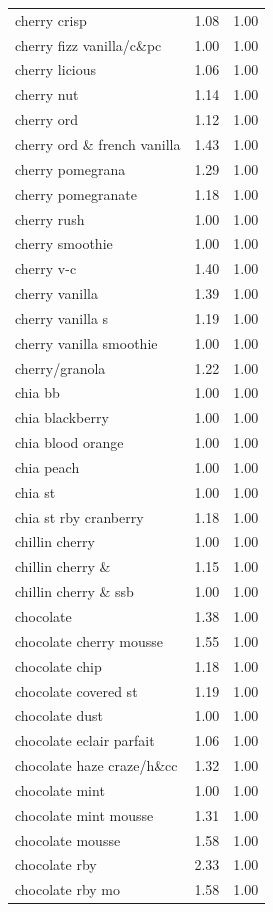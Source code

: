 \begin{table}
\begin{tabular}{lrr}
cherry crisp & 1.08 & 1.00 \\
cherry fizz vanilla/c\&pc & 1.00 & 1.00 \\
cherry licious & 1.06 & 1.00 \\
cherry nut & 1.14 & 1.00 \\
cherry ord & 1.12 & 1.00 \\
cherry ord \& french vanilla & 1.43 & 1.00 \\
cherry pomegrana & 1.29 & 1.00 \\
cherry pomegranate & 1.18 & 1.00 \\
cherry rush & 1.00 & 1.00 \\
cherry smoothie & 1.00 & 1.00 \\
cherry v-c & 1.40 & 1.00 \\
cherry vanilla & 1.39 & 1.00 \\
cherry vanilla s & 1.19 & 1.00 \\
cherry vanilla smoothie & 1.00 & 1.00 \\
cherry/granola & 1.22 & 1.00 \\
chia bb & 1.00 & 1.00 \\
chia blackberry & 1.00 & 1.00 \\
chia blood orange & 1.00 & 1.00 \\
chia peach & 1.00 & 1.00 \\
chia st & 1.00 & 1.00 \\
chia st rby cranberry & 1.18 & 1.00 \\
chillin cherry & 1.00 & 1.00 \\
chillin cherry \& & 1.15 & 1.00 \\
chillin cherry \& ssb & 1.00 & 1.00 \\
chocolate & 1.38 & 1.00 \\
chocolate cherry mousse & 1.55 & 1.00 \\
chocolate chip & 1.18 & 1.00 \\
chocolate covered st & 1.19 & 1.00 \\
chocolate dust & 1.00 & 1.00 \\
chocolate eclair parfait & 1.06 & 1.00 \\
chocolate haze craze/h\&cc & 1.32 & 1.00 \\
chocolate mint & 1.00 & 1.00 \\
chocolate mint mousse & 1.31 & 1.00 \\
chocolate mousse & 1.58 & 1.00 \\
chocolate rby & 2.33 & 1.00 \\
chocolate rby mo & 1.58 & 1.00 \\

\end{tabular}
\end{table}
